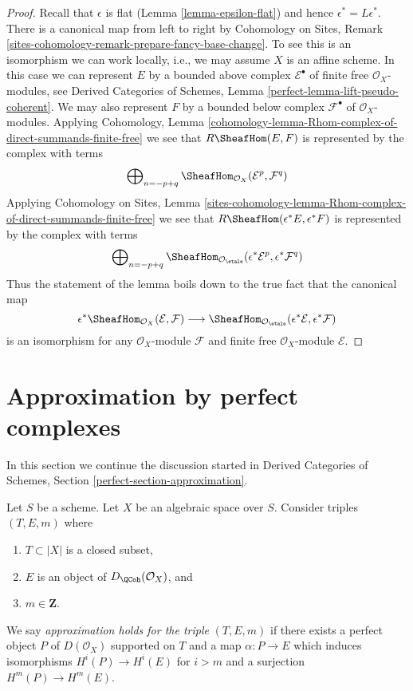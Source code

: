 \begin{proof}
Recall that $\epsilon$ is flat (Lemma \ref{lemma-epsilon-flat}) and
hence $\epsilon^* = L\epsilon^*$. There is a canonical map
from left to right by
Cohomology on Sites, Remark
\ref{sites-cohomology-remark-prepare-fancy-base-change}.
To see this is an isomorphism we can work locally, i.e., we may
assume $X$ is an affine scheme. In this case we can represent
$E$ by a bounded above complex $\mathcal{E}^\bullet$
of finite free $\mathcal{O}_X$-modules, see
Derived Categories of Schemes, Lemma \ref{perfect-lemma-lift-pseudo-coherent}.
We may also represent $F$ by a bounded below complex $\mathcal{F}^\bullet$
of $\mathcal{O}_X$-modules. Applying
Cohomology, Lemma
\ref{cohomology-lemma-Rhom-complex-of-direct-summands-finite-free}
we see that $R\SheafHom(E, F)$ is represented by the complex with terms
$$
\bigoplus\nolimits_{n = - p + q}
\SheafHom_{\mathcal{O}_X}(\mathcal{E}^p, \mathcal{F}^q)
$$
Applying Cohomology on Sites, Lemma
\ref{sites-cohomology-lemma-Rhom-complex-of-direct-summands-finite-free}
we see that $R\SheafHom(\epsilon^*E, \epsilon^*F)$ is represented by the
complex with terms
$$
\bigoplus\nolimits_{n = - p + q}
\SheafHom_{\mathcal{O}_\etale}
(\epsilon^*\mathcal{E}^p, \epsilon^*\mathcal{F}^q)
$$
Thus the statement of the lemma boils down to the true fact
that the canonical map
$$
\epsilon^*\SheafHom_{\mathcal{O}_X}(\mathcal{E}, \mathcal{F})
\longrightarrow
\SheafHom_{\mathcal{O}_\etale}
(\epsilon^*\mathcal{E}, \epsilon^*\mathcal{F})
$$
is an isomorphism for any $\mathcal{O}_X$-module $\mathcal{F}$ and
finite free $\mathcal{O}_X$-module $\mathcal{E}$.
\end{proof}









\section{Approximation by perfect complexes}
\label{section-approximation}

\noindent
In this section we continue the discussion started in
Derived Categories of Schemes, Section \ref{perfect-section-approximation}.

\begin{definition}
\label{definition-approximation-holds}
Let $S$ be a scheme. Let $X$ be an algebraic space over $S$.
Consider triples $(T, E, m)$ where
\begin{enumerate}
\item $T \subset |X|$ is a closed subset,
\item $E$ is an object of $D_\QCoh(\mathcal{O}_X)$, and
\item $m \in \mathbf{Z}$.
\end{enumerate}
We say {\it approximation holds for the triple} $(T, E, m)$ if
there exists a perfect object $P$ of $D(\mathcal{O}_X)$ supported on $T$
and a map $\alpha : P \to E$ which induces isomorphisms $H^i(P) \to H^i(E)$
for $i > m$ and a surjection $H^m(P) \to H^m(E)$.
\end{definition}

